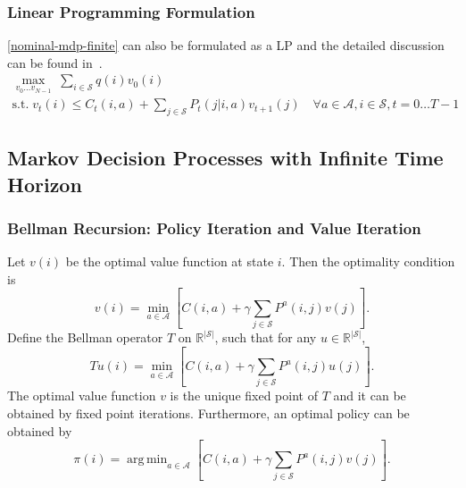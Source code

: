 \documentclass[11pt,reqno]{amsart}
\theoremstyle{definition}
\numberwithin{equation}{section}
\theoremstyle{remark}
\DeclareMathOperator*{\argmin}{arg\,min}
\begin{document}

\subsubsection{Linear Programming Formulation}
\ref{nominal-mdp-finite} can also be formulated as a LP and the detailed discussion can be found in~\cite{puterman2014markov}.
\begin{equation}\label{lp:finite}
    \begin{gathered}
    \max_{v_0\ldots v_{N-1}} \; \sum_{i\in\mathcal{S}}q(i)v_0(i) \\
    \text{s.t.} \; v_t(i)\leq C_t(i,a)+\sum_{j\in\mathcal{S}}P_t(j|i,a)v_{t+1}(j)\quad\forall a\in\mathcal{A},i\in\mathcal{S},t=0\ldots T-1
\end{gathered}
\end{equation}

\newpage

\subsection{Markov Decision Processes with Infinite Time Horizon}


\subsubsection{Bellman Recursion: Policy Iteration and Value Iteration}
Let $v(i)$ be the optimal value function at state $i$. Then the optimality condition is 
\begin{equation}\label{bellman-optimal-condition}
    v(i)=\min_{a\in\mathcal{A}}\left[C(i,a)+\gamma\sum_{j\in\mathcal{S}}P^a(i,j)v(j)\right].
\end{equation}
Define the Bellman operator $T$ on $\mathbb{R}^{|\mathcal{S}|}$, such that for any $u\in\mathbb{R}^{|\mathcal{S}|}$,
\begin{equation}
    Tu(i)=\min_{a\in\mathcal{A}}\left[C(i,a)+\gamma\sum_{j\in\mathcal{S}}P^a(i,j)u(j)\right].
\end{equation}
 The optimal value function $v$ is the unique fixed point of $T$ and it can be obtained by fixed point iterations. Furthermore, an optimal policy can be obtained by
 \begin{equation}
    \pi(i)=\argmin_{a\in\mathcal{A}}\left[C(i,a)+\gamma\sum_{j\in\mathcal{S}}P^a(i,j)v(j)\right].
\end{equation}
\end{document}
